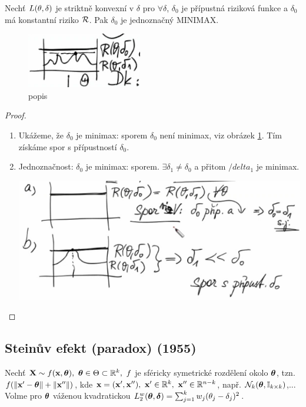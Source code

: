 \begin{theorem}["Obrátka"]
	Nechť $L(\theta,\delta)$ je striktně konvexní v $\delta$ pro $\forall\delta$, $\delta_0$ je přípustná riziková funkce a $\delta_0$ má konstantní riziko $\mathcal{R}$. Pak $\delta_0$ je jednoznačný MINIMAX.
	\begin{figure}[h]
		\centering
		\includegraphics[width=0.4\linewidth]{pictures/26.11-3}
		\caption{popis}
		\label{fig:26-3}
	\end{figure}
	
	\begin{proof}
		\begin{enumerate}[1)]
			\item Ukážeme, že $\delta_0$ je minimax: sporem $\delta_0$ není minimax, viz obrázek \ref{fig:26-3}. Tím získáme spor s přípustností $\delta_0$.
			\item Jednoznačnost: $\delta_0$ je minimax: sporem. $\exists\delta_1\neq\delta_0$ a přitom $/delta_1$ je minimax.
			\begin{center}
				\includegraphics[width=0.7\linewidth]{pictures/26.11-4}
			\end{center}
		\end{enumerate}
	\end{proof}
\end{theorem}
\subsection{Steinův efekt (paradox) (1955)}
Nechť $\textbf{X}\sim f(\textbf{x},\boldsymbol{\theta}),~\boldsymbol{\theta}\in\Theta\subset\mathbb{R}^k,~f$ je sféricky symetrické rozdělení okolo $\boldsymbol{\theta}$, tzn. $f(\left\|\textbf{x}'-\boldsymbol{\theta}\right\|+\left\|\textbf{x}''\right\|)$, kde $\textbf{x}=(\textbf{x}',\textbf{x}''),~\textbf{x}'\in\mathbb{R}^k,~\textbf{x}''\in\mathbb{R}^{n-k}$, např. $\mathcal{N}_k(\boldsymbol{\theta},\mathbb{I}_{k\times k})$,... Volme pro $\boldsymbol{\theta}$ váženou kvadratickou $L_2^w(\boldsymbol{\theta},\boldsymbol{\delta})=\sum_{j=1}^k w_j(\theta_j-\delta_j)^2$. 
	
